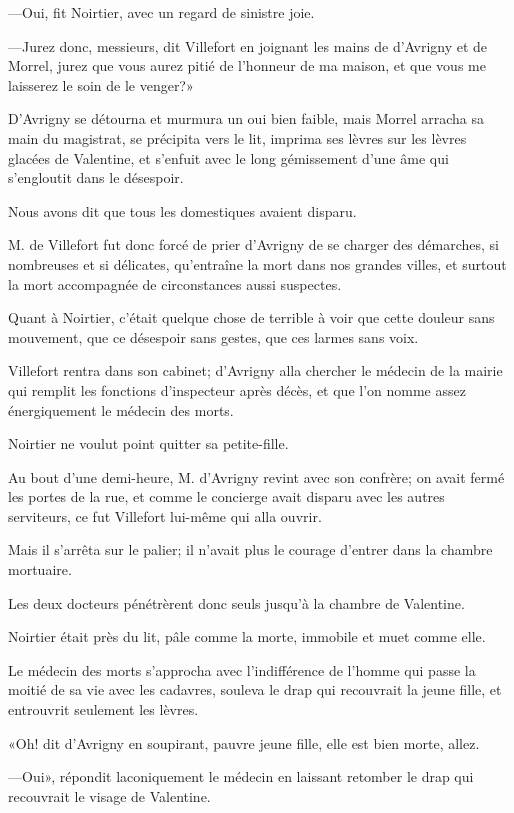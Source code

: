—Oui, fit Noirtier, avec un regard de sinistre joie. 

—Jurez donc, messieurs, dit Villefort en joignant les mains de d'Avrigny et de Morrel, jurez que vous aurez pitié de l'honneur de ma maison, et que vous me laisserez le soin de le venger?» 

D'Avrigny se détourna et murmura un oui bien faible, mais Morrel arracha sa main du magistrat, se précipita vers le lit, imprima ses lèvres sur les lèvres glacées de Valentine, et s'enfuit avec le long gémissement d'une âme qui s'engloutit dans le désespoir. 

Nous avons dit que tous les domestiques avaient disparu. 

M. de Villefort fut donc forcé de prier d'Avrigny de se charger des démarches, si nombreuses et si délicates, qu'entraîne la mort dans nos grandes villes, et surtout la mort accompagnée de circonstances aussi suspectes. 

Quant à Noirtier, c'était quelque chose de terrible à voir que cette douleur sans mouvement, que ce désespoir sans gestes, que ces larmes sans voix. 

Villefort rentra dans son cabinet; d'Avrigny alla chercher le médecin de la mairie qui remplit les fonctions d'inspecteur après décès, et que l'on nomme assez énergiquement le médecin des morts. 

Noirtier ne voulut point quitter sa petite-fille. 

Au bout d'une demi-heure, M. d'Avrigny revint avec son confrère; on avait fermé les portes de la rue, et comme le concierge avait disparu avec les autres serviteurs, ce fut Villefort lui-même qui alla ouvrir. 

Mais il s'arrêta sur le palier; il n'avait plus le courage d'entrer dans la chambre mortuaire. 

Les deux docteurs pénétrèrent donc seuls jusqu'à la chambre de Valentine. 

Noirtier était près du lit, pâle comme la morte, immobile et muet comme elle. 

Le médecin des morts s'approcha avec l'indifférence de l'homme qui passe la moitié de sa vie avec les cadavres, souleva le drap qui recouvrait la jeune fille, et entrouvrit seulement les lèvres. 

«Oh! dit d'Avrigny en soupirant, pauvre jeune fille, elle est bien morte, allez. 

—Oui», répondit laconiquement le médecin en laissant retomber le drap qui recouvrait le visage de Valentine. 

